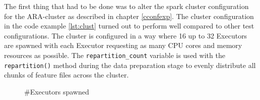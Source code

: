 \noindent The first thing that had to be done was to alter the spark cluster configuration for the ARA-cluster as described in chapter \ref{cconfexp}.
\noindent The cluster configuration in the code example \ref{lst:clust} turned out to perform well compared to other test configurations. The cluster is configured in a way where 16 up to 32 Executors are spawned with each Executor requesting as many CPU cores and memory resources as possible. The \lstinline{repartition_count} variable is used with the \lstinline{repartition()} method during the data preparation stage to evenly distribute all chunks of feature files across the cluster.\\

\FloatBarrier
\begin{figure}[htbp]
   	\centering
   	\caption{\#Executors spawned}
   	\label{perfspark7}
\end{figure}
\FloatBarrier

